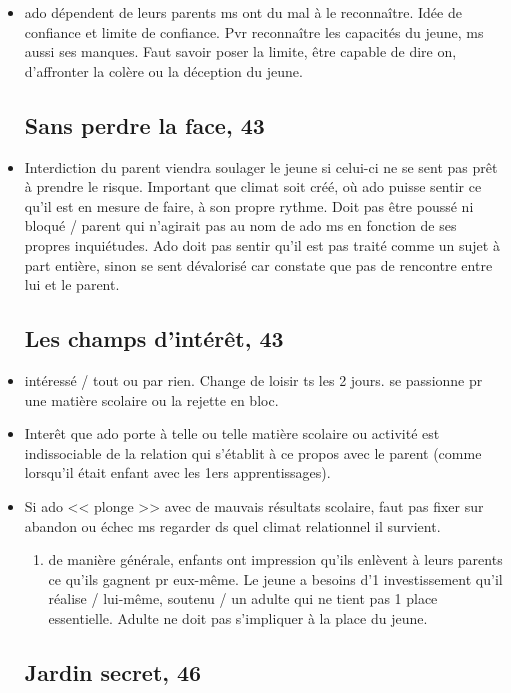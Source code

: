 \documentclass[12pt]{report}
\begin{document}
\begin{itemize}
\item ado dépendent de leurs parents ms ont du mal à le reconnaître. Idée de confiance et limite de confiance. Pvr reconnaître les capacités du jeune, ms aussi ses manques. Faut savoir poser la limite, être capable de dire on, d'affronter la colère ou la déception du jeune. 

\subsection{Sans perdre la face, 43}

\item Interdiction du parent viendra soulager le jeune si celui-ci ne se sent pas prêt à prendre le risque. Important que climat soit créé, où ado puisse sentir ce qu'il est en mesure de faire, à son propre rythme. Doit pas être poussé ni bloqué / parent qui n'agirait pas au nom de ado ms en fonction de ses propres inquiétudes. Ado doit pas sentir qu'il est pas traité comme un sujet à part entière, sinon se sent dévalorisé car constate que pas de rencontre entre lui et le parent.

\subsection{Les champs d'intérêt, 43}

\item intéressé / tout ou par rien. Change de loisir ts les 2 jours. se passionne pr une matière scolaire ou la rejette en bloc.\\
\item Interêt que ado porte à telle ou telle matière scolaire ou activité est indissociable de la relation qui s'établit à ce propos avec le parent (comme lorsqu'il était enfant avec les 1ers apprentissages).\\
\item Si ado << plonge >> avec de mauvais résultats scolaire, faut pas fixer sur abandon ou échec ms regarder ds quel climat relationnel il survient.
\begin{enumerate}
\item de manière générale, enfants ont impression qu'ils enlèvent à leurs parents ce qu'ils gagnent pr eux-même. Le jeune a besoins d'1 investissement qu'il réalise / lui-même, soutenu / un adulte qui ne tient pas 1 place essentielle. Adulte ne doit pas s'impliquer à la place du jeune.
\end{enumerate}

\subsection{Jardin secret, 46}



\end{itemize}
\end{document}
